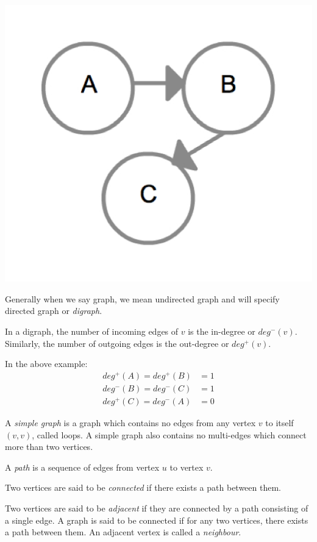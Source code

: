 {
  \includegraphics[scale=0.2]{DiGraph}
  \label{fig:DiGraph}
}

Generally when we say graph, we mean undirected graph and will specify
directed graph or \emph{digraph}.

In a digraph, the number of incoming edges of $v$ is the in-degree or
$deg^-(v)$.  Similarly, the number of outgoing edges is the
out-degree or $deg^+(v)$.

In the above example:
%
\begin{align*}
deg^+(A) = deg^+(B) &= 1 \\
deg^-(B) = deg^-(C) &= 1 \\
deg^+(C) = deg^-(A) &= 0
\end{align*}

A \emph{simple graph} is a graph which contains no edges from any
vertex $v$ to itself $ (v,v) $, called loops.  A simple graph also
contains no multi-edges which connect more than two vertices.

A \emph{path} is a sequence of edges from vertex $u$ to vertex $v$.

Two vertices are said to be \emph{connected} if there exists a path
between them.  

Two vertices are said to be \emph{adjacent} if they are connected by a
path consisting of a single edge.  A graph is said to be connected if
for any two vertices, there exists a path between them. An adjacent
vertex is called a \emph{neighbour}.

